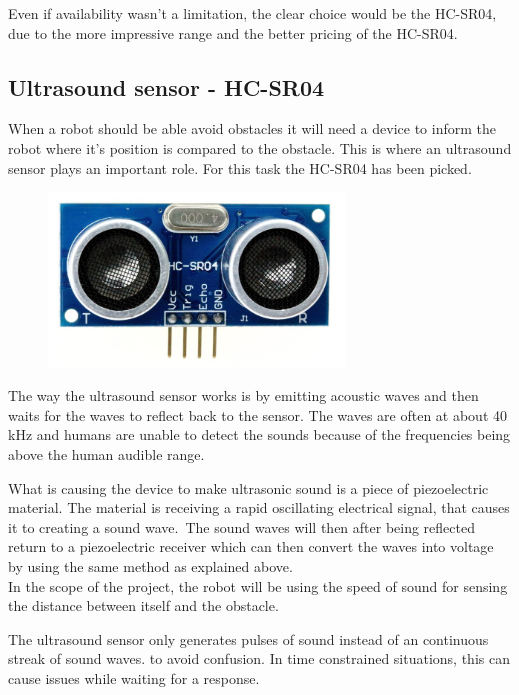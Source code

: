 Even if availability wasn't a limitation, the clear choice would be the HC-SR04, due to the more impressive range and the better pricing of the HC-SR04.
\newpage
\subsection{Ultrasound sensor - HC-SR04}
When a robot should be able avoid obstacles it will need a device to inform the robot where it's position is compared to the obstacle. This is where an ultrasound sensor plays an important role. For this task the HC-SR04 has been picked.\\

\begin{figure}[!ht]
	\centering
	\includegraphics[width=0.7\textwidth]{figures/hc04.jpg}
	\caption{}
	\label{HC-SR04}
\end{figure}


The way the ultrasound sensor works is by emitting acoustic waves and then waits for the waves to reflect back to the sensor. The waves are often at about 40 kHz and humans are unable to detect the sounds because of the frequencies being above the human audible range.\

What is causing the device to make ultrasonic sound is a piece of piezoelectric material. The material is receiving a rapid oscillating electrical signal, that causes  it to creating a sound wave.\ The sound waves will then after being reflected return to a piezoelectric receiver which can then convert the waves into voltage by using the same method as explained above. \\

In the scope of the project, the robot will be using the speed of sound for sensing the distance between itself and the obstacle.\

The ultrasound sensor only generates pulses of sound instead of an continuous streak of sound waves. to avoid confusion. In time constrained situations, this can cause issues while waiting for a response.\\ 

